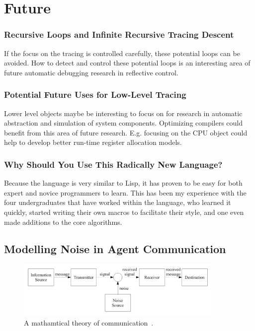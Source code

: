 \chapter{Future}\label{ch:future}

\subsection{Recursive Loops and Infinite Recursive Tracing Descent}

If the focus on the tracing is controlled carefully, these potential
loops can be avoided.  How to detect and control these potential loops
is an interesting area of future automatic debugging research in
reflective control.

\subsection{Potential Future Uses for Low-Level Tracing}

Lower level objects maybe be interesting to focus on for research in
automatic abstraction and simulation of system components.  Optimizing
compilers could benefit from this area of future research.  E.g.
focusing on the CPU object could help to develop better run-time
register allocation models.

\subsection{Why Should You Use This Radically New Language?}

Because the language is very similar to Lisp, it has proven to be easy
for both expert and novice programmers to learn.  This has been my
experience with the four undergraduates that have worked within the
language, who learned it quickly, started writing their own macros to
facilitate their style, and one even made additions to the core
algorithms.

\section{Modelling Noise in Agent Communication}

\begin{figure}[bth]
  \center
  \includegraphics[width=10cm]{gfx/communication_theory}
  \caption[A mathematical theory of communication]{A mathamtical
    theory of communication~\citep{shannon:1959}.}
  \label{fig:communication_theory}
\end{figure}

